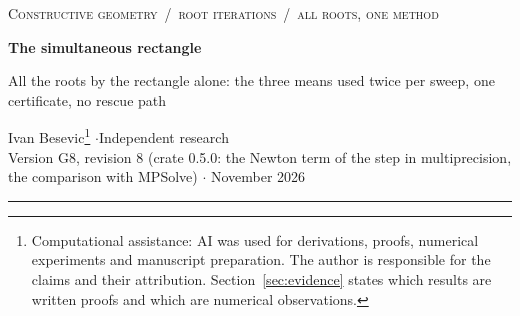 \documentclass[10pt,a4paper]{article}
\theoremstyle{definition}
\numberwithin{equation}{section}
\begin{document}
{\small\scshape Constructive geometry \,/\, root iterations \,/\, all roots, one method}

\vspace{6pt}
{\LARGE\bfseries The simultaneous rectangle\par}
\vspace{3pt}
{\large All the roots by the rectangle alone: the three means used twice per sweep, one certificate,
no rescue path\par}
\vspace{8pt}
Ivan Besevic\footnote{Computational assistance: AI was used for derivations, proofs, numerical
experiments and manuscript preparation. The author is responsible for the claims and their
attribution. Section~\ref{sec:evidence} states which results are written proofs and which are
numerical observations.}
\quad$\cdot$\quad Independent research\\
Version G8, revision 8 (crate 0.5.0: the Newton term of the step in multiprecision, the comparison with
MPSolve) \quad$\cdot$ November 2026

\vspace{6pt}\hrule\vspace{8pt}
\end{document}
